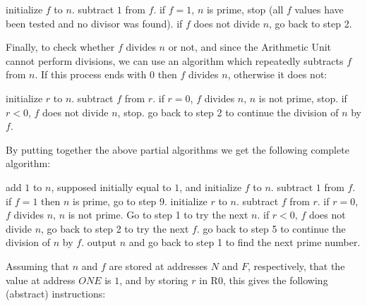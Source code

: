 \begin{algorithmic}[1]
\State initialize $f$ to $n$.
\State subtract $1$ from $f$.
\State if $f=1$, $n$ is prime, stop (all $f$ values have been tested and no
divisor was found).
\State if $f$ does not divide $n$, go back to step 2.
\end{algorithmic}

Finally, to check whether $f$ divides $n$ or not, and since the Arithmetic Unit
cannot perform divisions, we can use an algorithm which repeatedly subtracts
$f$ from $n$. If this process ends with 0 then $f$ divides $n$,
otherwise it does not:

\begin{algorithmic}[1]
\State initialize $r$ to $n$.
\State subtract $f$ from $r$.
\State if $r=0$, $f$ divides $n$, $n$ is not prime, stop.
\State if $r<0$, $f$ does not divide $n$, stop.
\State go back to step 2 to continue the division of $n$ by $f$.
\end{algorithmic}

By putting together the above partial algorithms we get the following complete
algorithm:

\begin{algorithmic}[1]
\State add $1$ to $n$, supposed initially equal to $1$, and initialize $f$ to
$n$.
\State subtract $1$ from $f$.
\State if $f=1$ then $n$ is prime, go to step 9.
\State initialize $r$ to $n$.
\State subtract $f$ from $r$.
\State if $r=0$, $f$ divides $n$, $n$ is not prime. Go to step 1 to try the
next $n$.
\State if $r<0$, $f$ does not divide $n$, go back to step 2 to try the next $f$.
\State go back to step 5 to continue the division of $n$ by $f$.
\State output $n$ and go back to step 1 to find the next prime number.
\end{algorithmic}

Assuming that $n$ and $f$ are stored at addresses $N$ and $F$, respectively,
that the value at address $\mathit{ONE}$ is $1$, and by storing $r$ in R0, this
gives the following (abstract) instructions:

